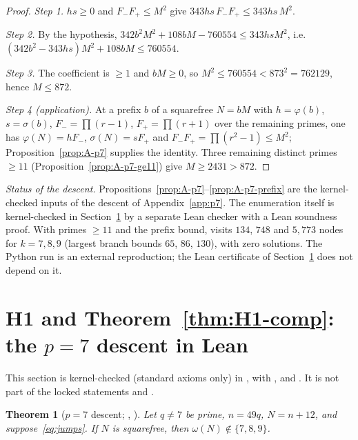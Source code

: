 \documentclass[11pt,reqno]{amsart}
\newcommand{\ph}{\varphi}
\newcommand{\sig}{\sigma}
\newtheorem{theorem}{Theorem}
\theoremstyle{definition}
\begin{document}
\begin{proof}
\textit{Step 1.} \(hs\ge 0\) and \(F_-F_+\le M^2\) give \(343hs\,F_-F_+\le 343hs\,M^2\).

\textit{Step 2.} By the hypothesis, \(342b^2M^2+108bM-760554\le 343hsM^2\), i.e.\ \((342b^2-343hs)M^2+108bM\le 760554\).

\textit{Step 3.} The coefficient is \(\ge 1\) and \(bM\ge 0\), so \(M^2\le 760554<873^2=762129\), hence \(M\le 872\).

\textit{Step 4 (application).} At a prefix \(b\) of a squarefree \(N=bM\) with \(h=\ph(b)\), \(s=\sig(b)\), \(F_-=\prod(r-1)\), \(F_+=\prod(r+1)\) over the remaining primes, one has \(\ph(N)=hF_-\), \(\sig(N)=sF_+\) and \(F_-F_+=\prod(r^2-1)\le M^2\); Proposition~\ref{prop:A-p7} supplies the identity. Three remaining distinct primes \(\ge 11\) (Proposition~\ref{prop:A-p7-ge11}) give \(M\ge 2431>872\).
\end{proof}

\noindent\textit{Status of the descent.} Propositions~\ref{prop:A-p7}--\ref{prop:A-p7-prefix} are the kernel-checked inputs of the descent of Appendix~\ref{app:p7}. The enumeration itself is kernel-checked in Section~\ref{sec:A-H1} by a separate Lean checker with a Lean soundness proof. With primes \(\ge 11\) and the prefix bound,  visits \(134\), \(748\) and \(5{,}773\) nodes for \(k=7,8,9\) (largest branch bounds \(65\), \(86\), \(130\)), with zero solutions. The Python run is an external reproduction; the Lean certificate of Section~\ref{sec:A-H1} does not depend on it.

\section{H1 and Theorem~\ref{thm:H1-comp}: the \(p=7\) descent in Lean}
\label{sec:A-H1}

This section is kernel-checked (standard axioms only) in ,  with ,  and . It is not part of the locked statements  and .

\begin{theorem}[\(p=7\) descent; , ]
\label{thm:A-p7-descent}
Let \(q\neq 7\) be prime, \(n=49q\), \(N=n+12\), and suppose~\eqref{eq:jumps}. If \(N\) is squarefree, then \(\omega(N)\notin\{7,8,9\}\).
\end{theorem}
\end{document}
